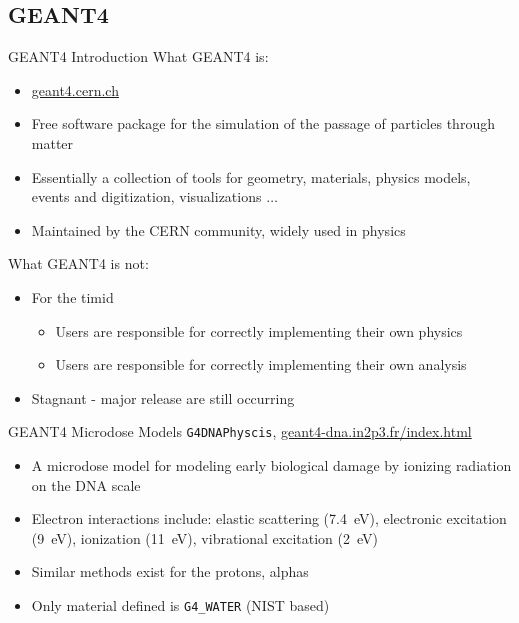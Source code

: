 \documentclass[compress]{beamer}
\begin{document}
\subsection{GEANT4}
\begin{frame}[fragile]{GEANT4 Introduction}
What GEANT4 is:
\begin{itemize}
  \small
  \item \href{geant4.cern.ch}{geant4.cern.ch}
  \item Free software package for the simulation of the passage of particles through matter
  \item Essentially a collection of tools for geometry, materials, physics models, events and digitization, visualizations $\dots$
  \item Maintained by the CERN community, widely used in physics
\end{itemize}
What GEANT4 is not:
\begin{itemize}
  \small
  \item For the timid
  \begin{itemize}
    \item Users are responsible for correctly implementing their own physics
    \item Users are responsible for correctly implementing their own analysis
  \end{itemize}
  \item Stagnant - major release are still occurring
\end{itemize}
\end{frame}
\begin{frame}[fragile]{GEANT4 Microdose Models}
\verb+G4DNAPhyscis+, \href{geant4-dna.in2p3.fr}{geant4-dna.in2p3.fr/index.html}
  \begin{itemize}
    \item A microdose model for modeling early biological damage by ionizing radiation on the DNA scale
    \item Electron interactions include: elastic scattering (\SI{7.4}{\eV}), electronic excitation (\SI{9}{\eV}), ionization (\SI{11}{\eV}), vibrational excitation (\SI{2}{\eV})
    \item Similar methods exist for the protons, alphas
    \item Only material defined is \verb+G4_WATER+ (NIST based)
  \end{itemize}
\end{frame}
\end{document}
